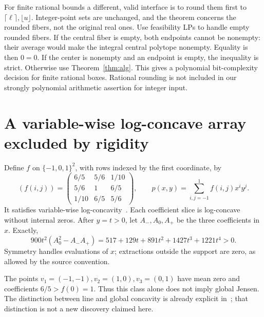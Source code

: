 \documentclass[11pt]{article}
\begin{document}
For finite rational bounds a different, valid interface is to round them first to \(\lceil\ell\rceil,\lfloor u\rfloor\). Integer-point sets are unchanged, and the theorem concerns the rounded fibers, not the original real ones. Use feasibility LPs to handle empty rounded fibers. If the central fiber is empty, both endpoints cannot be nonempty: their average would make the integral central polytope nonempty. Equality is then \(0=0\). If the center is nonempty and an endpoint is empty, the inequality is strict. Otherwise use Theorem~\ref{thm:alg}. This gives a polynomial bit-complexity decision for finite rational boxes. Rational rounding is not included in our strongly polynomial arithmetic assertion for integer input.

\section{A variable-wise log-concave array excluded by rigidity}
Define \(f\) on \(\{-1,0,1\}^2\), with rows indexed by the first coordinate, by
\[
(f(i,j))=
\begin{pmatrix}6/5&5/6&1/10\\5/6&1&6/5\\1/10&6/5&5/6\end{pmatrix},
\qquad p(x,y)=\sum_{i,j=-1}^1f(i,j)x^iy^j.
\]
It satisfies variable-wise log-concavity~\cite[Definition 2.1]{LMY}.
Each coefficient slice is log-concave without internal zeros. After \(y=t>0\), let \(A_-,A_0,A_+\) be the three coefficients in \(x\). Exactly,
\[
900t^2(A_0^2-A_-A_+)=517+129t+891t^2+1427t^3+1221t^4>0.
\]
Symmetry handles evaluations of \(x\); extractions outside the support are zero, as allowed by the source convention.

The points \(v_1=(-1,-1),v_2=(1,0),v_3=(0,1)\) have mean zero and coefficients \(6/5>f(0)=1\). Thus this class alone does not imply global Jensen. The distinction between line and global concavity is already explicit in~\cite{LMY}; that distinction is not a new discovery claimed here.
\end{document}
